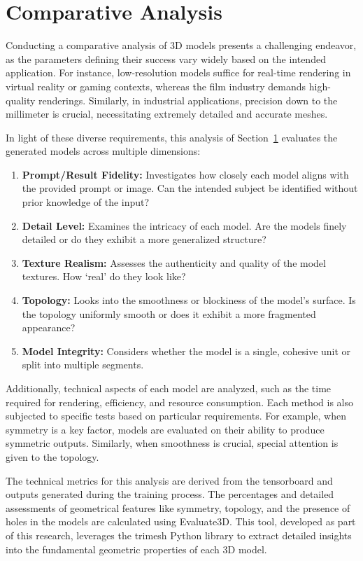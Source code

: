 \section{Comparative Analysis}\label{comparativeAnalysis}

Conducting a comparative analysis of 3D models presents a challenging endeavor, as the parameters defining their success vary widely based on the intended application. For instance, low-resolution models suffice for real-time rendering in virtual reality or gaming contexts, whereas the film industry demands high-quality renderings. Similarly, in industrial applications, precision down to the millimeter is crucial, necessitating extremely detailed and accurate meshes.

In light of these diverse requirements, this analysis of Section~\ref{comparativeAnalysis} evaluates the generated models across multiple dimensions:

\begin{enumerate}
    \item \textbf{Prompt/Result Fidelity:} Investigates how closely each model aligns with the provided prompt or image. Can the intended subject be identified without prior knowledge of the input?
    \item \textbf{Detail Level:} Examines the intricacy of each model. Are the models finely detailed or do they exhibit a more generalized structure?
    \item \textbf{Texture Realism:} Assesses the authenticity and quality of the model textures. How `real' do they look like?
    \item \textbf{Topology:} Looks into the smoothness or blockiness of the model's surface. Is the topology uniformly smooth or does it exhibit a more fragmented appearance?
    \item \textbf{Model Integrity:} Considers whether the model is a single, cohesive unit or split into multiple segments.
\end{enumerate}

Additionally, technical aspects of each model are analyzed, such as the time required for rendering, efficiency, and resource consumption. Each method is also subjected to specific tests based on particular requirements. For example, when symmetry is a key factor, models are evaluated on their ability to produce symmetric outputs. Similarly, when smoothness is crucial, special attention is given to the topology.

The technical metrics for this analysis are derived from the tensorboard and outputs generated during the training process. The percentages and detailed assessments of geometrical features like symmetry, topology, and the presence of holes in the models are calculated using Evaluate3D. This tool, developed as part of this research, leverages the trimesh Python library \citep{trimesh} to extract detailed insights into the fundamental geometric properties of each 3D model.

